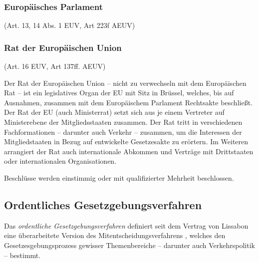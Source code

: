 \subsubsection{Europäisches Parlament}

\begin{center}
    {\footnotesize(Art. 13, 14 Abs. 1 EUV, Art 223f AEUV)}
\end{center}

\noindent

\subsubsection{Rat der Europäischen Union}

\begin{center}
    {\footnotesize(Art. 16 EUV, Art 137ff. AEUV)}
\end{center}

\noindent
Der Rat der Europäischen Union – nicht zu verwechseln mit dem Europäischen Rat – ist ein legislatives Organ der EU mit Sitz in Brüssel, welches, bis auf Ausnahmen, zusammen mit dem Europäischem Parlament Rechtsakte beschließt.
Der Rat der EU (auch Ministerrat) setzt sich aus je einem Vertreter auf Ministerebene der Mitgliedsstaaten zusammen. 
Der Rat tritt in verschiedenen Fachformationen -- darunter auch Verkehr -- zusammen, um die Interessen der Mitgliedstaaten in Bezug auf entwickelte Gesetzesakte zu erörtern.
Im Weiteren arrangiert der Rat auch internationale Abkommen und Verträge mit Drittstaaten oder internationalen Organisationen.

Beschlüsse werden einstimmig oder mit qualifizierter Mehrheit beschlossen.

        \subsection{Ordentliches Gesetzgebungsverfahren}

Das \textit{ordentliche Gesetzgebungsverfahren} definiert seit dem Vertrag von Lissabon eine überarbeitete Version des Mitentscheidungsverfahrens \cite[Art. 294]{AEUV}, welches den Gesetzesgebungsprozess gewisser Themenbereiche -- darunter auch Verkehrspolitik -- bestimmt. 

